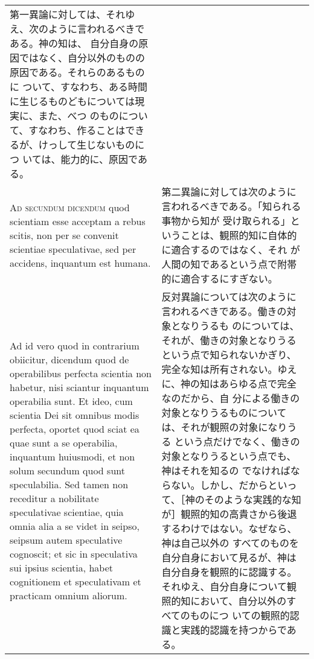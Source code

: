 \documentclass[10pt]{jsarticle} %
\begin{document}
\begin{longtable}{p{21em}p{21em}}
第一異論に対しては、それゆえ、次のように言われるべきである。神の知は、
自分自身の原因ではなく、自分以外のものの原因である。それらのあるものに
ついて、すなわち、ある時間に生じるものどもについては現実に、また、べつ
のものについて、すなわち、作ることはできるが、けっして生じないものにつ
いては、能力的に、原因である。


\\


{\scshape Ad secundum dicendum} quod scientiam esse
acceptam a rebus scitis, non per se convenit scientiae speculativae, sed
per accidens, inquantum est humana.

&

第二異論に対しては次のように言われるべきである。「知られる事物から知が
受け取られる」ということは、観照的知に自体的に適合するのではなく、それ
が人間の知であるという点で附帯的に適合するにすぎない。

\\


\hspace{1em}Ad id vero quod in contrarium obiicitur,
dicendum quod de operabilibus perfecta scientia non habetur, nisi
sciantur inquantum operabilia sunt. Et ideo, cum scientia Dei sit
omnibus modis perfecta, oportet quod sciat ea quae sunt a se operabilia,
inquantum huiusmodi, et non solum secundum quod sunt speculabilia. Sed
tamen non receditur a nobilitate speculativae scientiae, quia omnia alia
a se videt in seipso, seipsum autem speculative cognoscit; et sic in
speculativa sui ipsius scientia, habet cognitionem et speculativam et
practicam omnium aliorum.

&

反対異論については次のように言われるべきである。働きの対象となりうるも
のについては、それが、働きの対象となりうるという点で知られないかぎり、
完全な知は所有されない。ゆえに、神の知はあらゆる点で完全なのだから、自
分による働きの対象となりうるものについては、それが観照の対象になりうる
という点だけでなく、働きの対象となりうるという点でも、神はそれを知るの
でなければならない。しかし、だからといって、［神のそのような実践的な知
が］観照的知の高貴さから後退するわけではない。なぜなら、神は自己以外の
すべてのものを自分自身において見るが、神は自分自身を観照的に認識する。
それゆえ、自分自身について観照的知において、自分以外のすべてのものにつ
いての観照的認識と実践的認識を持つからである。




\end{longtable}
\newpage
\end{document}
